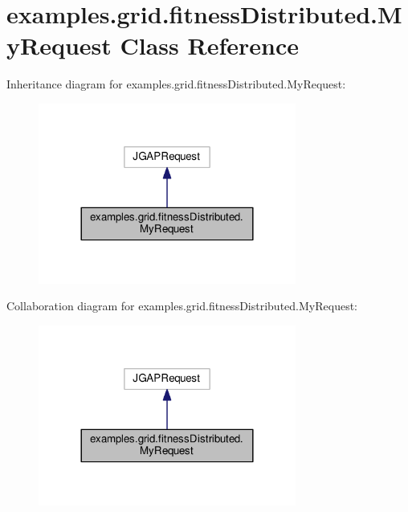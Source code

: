 \hypertarget{classexamples_1_1grid_1_1fitness_distributed_1_1_my_request}{\section{examples.\-grid.\-fitness\-Distributed.\-My\-Request Class Reference}
\label{classexamples_1_1grid_1_1fitness_distributed_1_1_my_request}
}


Inheritance diagram for examples.\-grid.\-fitness\-Distributed.\-My\-Request\-:
\nopagebreak
\begin{figure}[H]
\begin{center}
\leavevmode
\includegraphics[width=240pt]{classexamples_1_1grid_1_1fitness_distributed_1_1_my_request__inherit__graph}
\end{center}
\end{figure}


Collaboration diagram for examples.\-grid.\-fitness\-Distributed.\-My\-Request\-:
\nopagebreak
\begin{figure}[H]
\begin{center}
\leavevmode
\includegraphics[width=240pt]{classexamples_1_1grid_1_1fitness_distributed_1_1_my_request__coll__graph}
\end{center}
\end{figure}
